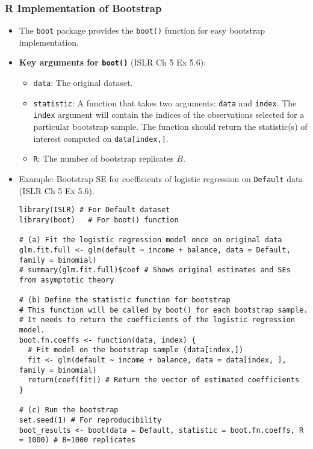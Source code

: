 \documentclass[12pt,a4paper]{article}
\newcommand{\Rpackage}[1]{\texttt{#1}} %
\newcommand{\Rfunction}[1]{\texttt{#1()}} %
\newcommand{\Robject}[1]{\texttt{#1}} %
\newcommand{\Rcode}[1]{\texttt{#1}} %
\begin{document}
\begin{itemize}
\begin{itemize}
\begin{itemize}
    \subsubsection{R Implementation of Bootstrap }
        \begin{itemize}
            \item The \Rpackage{boot} package provides the \Rfunction{boot} function for easy bootstrap implementation.
            \item \textbf{Key arguments for \Rfunction{boot}} (ISLR Ch 5 Ex 5.6):
                \begin{itemize}
                    \item \Rcode{data}: The original dataset.
                    \item \Rcode{statistic}: A function that takes two arguments: \Rcode{data} and \Rcode{index}. The \Rcode{index} argument will contain the indices of the observations selected for a particular bootstrap sample. The function should return the statistic(s) of interest computed on \Rcode{data[index,]}.
                    \item \Rcode{R}: The number of bootstrap replicates $B$.
                \end{itemize}
            \item Example: Bootstrap SE for coefficients of logistic regression on \Robject{Default} data (ISLR Ch 5 Ex 5.6).
\begin{lstlisting}[caption={Bootstrap for Logistic Regression Coefficients (ISLR Ch 5 Ex 5.6)}]
library(ISLR) # For Default dataset
library(boot)   # For boot() function

# (a) Fit the logistic regression model once on original data
glm.fit.full <- glm(default ~ income + balance, data = Default, family = binomial)
# summary(glm.fit.full)$coef # Shows original estimates and SEs from asymptotic theory

# (b) Define the statistic function for bootstrap
# This function will be called by boot() for each bootstrap sample.
# It needs to return the coefficients of the logistic regression model.
boot.fn.coeffs <- function(data, index) {
  # Fit model on the bootstrap sample (data[index,])
  fit <- glm(default ~ income + balance, data = data[index, ], family = binomial)
  return(coef(fit)) # Return the vector of estimated coefficients
}

# (c) Run the bootstrap
set.seed(1) # For reproducibility
boot_results <- boot(data = Default, statistic = boot.fn.coeffs, R = 1000) # B=1000 replicates


\end{lstlisting}
\end{itemize}
\end{itemize}
\end{itemize}
\end{itemize}
\end{document}

